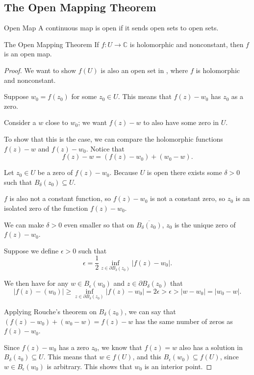 \documentclass{article}
\begin{document}
\subsection{The Open Mapping Theorem}

\begin{defn}{Open Map}{}
A continuous map is open if it sends open sets to open sets. 
\end{defn}

\begin{thrm}{The Open Mapping Theorem}{}
If \( f: U \to \mathbb{C}  \) is holomorphic and nonconstant, then \( f \) is an open map. 
\tcbline
\begin{proof}
We want to show \( f(U) \) is also an open set in \C{}, where \( f \) is holomorphic and nonconstant. 

Suppose \( w_0 = f(z_0) \) for some \( z_0 \in U\). This means that \( f(z) - w_0 \) has \( z_0 \) as a zero. 

Consider a \( w \) close to \( w_0 \); we want \( f(z) - w \) to also have some zero in \( U \). 

To show that this is the case, we can compare the holomorphic functions \( f(z) - w \) and \( f(z) - w_0 \). Notice that 
\[
    f(z) - w = (f(z)- w_0) + (w_0 - w).
\]

Let \( z_0 \in U\) be a zero of \( f(z) - w_0 \). Because \( U \) is open there exists some \( \delta > 0 \) such that \( B_\delta (z_0) \subseteq U \). 

\( f \) is also not a constant function, so \( f(z) - w_0 \) is not a constant zero, so \( z_0 \) is an isolated zero of the function \( f(z) - w_0 \).

We can make \( \delta > 0  \) even smaller so that on \(\overline{B_\delta (z_0)}   \), \( z_0 \) is the unique zero of \( f(z) - w_0 \). 

Suppose we define \(\epsilon >0   \) such that 
\[
    \epsilon  = \frac{1}{2}\inf _{z \in \partial B_\delta (z_0)}|f(z) - w_0|.
\]

We then have for any \( w \in B_{\epsilon }(w_0)  \) and \( z \in \partial B_\delta(z_0)  \) that 
\[
   |f(z) - (w_0)| \geq \inf _{z \in \partial B_\delta (z_0)}|f(z) - w_0| = 2\epsilon >\epsilon >|w - w_0| = |w_0 - w|.
\]

Applying Rouche's theorem on \( B_\delta (z_0) \), we can say that \( (f(z)- w_0) + (w_0 - w) = f(z) - w \)  has the same number of zeros as \( f(z) - w_0 \). 

Since \( f(z) - w_0 \) has a zero \( z_0 \), we know that \( f(z) = w \) also has a solution in \( B_\delta (z_0) \subseteq U \). This means that \( w \in f(U) \), and this \( B_{\epsilon }(w_0) \subseteq f(U)  \), since \( w \in B_{\epsilon }(w_0)  \) is arbitrary. This shows that \( w_0 \) is an interior point. 
\end{proof}
\end{thrm}
\end{document}
